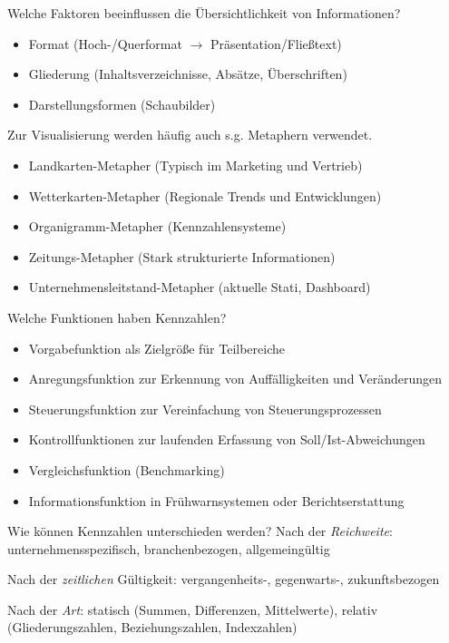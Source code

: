 \documentclass[a6paper,10pt,grid=front%
,toc
]{kartei}
\begin{document}
  \begin{karte}{Welche Faktoren beeinflussen die Übersichtlichkeit von Informationen?}  

    \begin{itemize}
      \item Format (Hoch-/Querformat $\rightarrow$ Präsentation/Fließtext)
      \item Gliederung (Inhaltsverzeichnisse, Absätze, Überschriften)
      \item Darstellungsformen (Schaubilder)
    \end{itemize}

    Zur Visualisierung werden häufig auch s.g. Metaphern verwendet.

    \begin{itemize}
      \item Landkarten-Metapher (Typisch im Marketing und Vertrieb)
      \item Wetterkarten-Metapher (Regionale Trends und Entwicklungen)
      \item Organigramm-Metapher (Kennzahlensysteme)
      \item Zeitungs-Metapher (Stark strukturierte Informationen)
      \item Unternehmensleitstand-Metapher (aktuelle Stati, Dashboard)
    \end{itemize}
    
  \end{karte}

  \begin{karte}{Welche Funktionen haben Kennzahlen?}  
        
    \begin{itemize}
      \item Vorgabefunktion als Zielgröße für Teilbereiche
      \item Anregungsfunktion zur Erkennung von Auffälligkeiten und Veränderungen
      \item Steuerungsfunktion zur Vereinfachung von Steuerungsprozessen
      \item Kontrollfunktionen zur laufenden Erfassung von Soll/Ist-Abweichungen
      \item Vergleichsfunktion (Benchmarking)
      \item Informationsfunktion in Frühwarnsystemen oder Berichtserstattung
    \end{itemize}
  \end{karte} 

  \begin{karte}{Wie können Kennzahlen unterschieden werden?}  
    Nach der \textit{Reichweite}: unternehmensspezifisch, branchenbezogen, allgemeingültig

    Nach der \textit{zeitlichen} Gültigkeit: vergangenheits-, gegenwarts-, zukunftsbezogen

    Nach der \textit{Art}: statisch (Summen, Differenzen, Mittelwerte), relativ (Gliederungszahlen, Beziehungszahlen, Indexzahlen)
  \end{karte}
\end{document}
